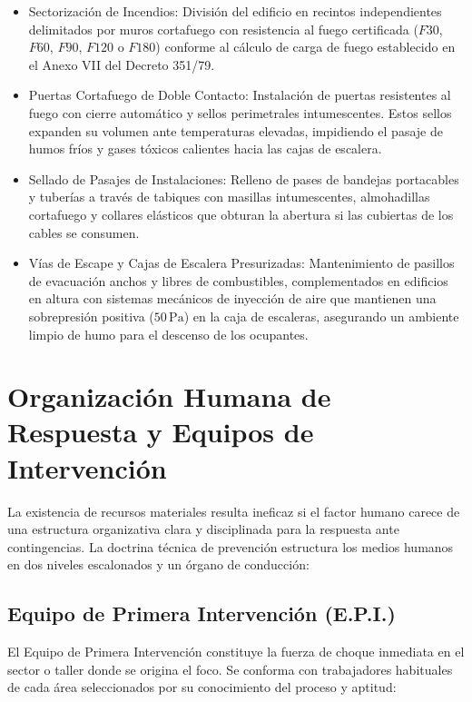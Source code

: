 \begin{itemize}
    \item Sectorización de Incendios: División del edificio en recintos independientes delimitados por muros cortafuego con
          resistencia al fuego certificada ($F30$, $F60$, $F90$, $F120$ o $F180$) conforme al cálculo de carga de fuego
          establecido en el Anexo VII del Decreto 351/79.
    \item Puertas Cortafuego de Doble Contacto: Instalación de puertas resistentes al fuego con cierre automático y sellos
          perimetrales intumescentes. Estos sellos expanden su volumen ante temperaturas elevadas, impidiendo el pasaje de
          humos fríos y gases tóxicos calientes hacia las cajas de escalera.
    \item Sellado de Pasajes de Instalaciones: Relleno de pases de bandejas portacables y tuberías a través de tabiques
          con masillas intumescentes, almohadillas cortafuego y collares elásticos que obturan la abertura si las cubiertas
          de los cables se consumen.
    \item Vías de Escape y Cajas de Escalera Presurizadas: Mantenimiento de pasillos de evacuación anchos y libres de
          combustibles, complementados en edificios en altura con sistemas mecánicos de inyección de aire que mantienen
          una sobrepresión positiva ($50\,\mathrm{Pa}$) en la caja de escaleras, asegurando un ambiente limpio de humo
          para el descenso de los ocupantes.
\end{itemize}

\section{Organización Humana de Respuesta y Equipos de Intervención}
\label{sec.cap7:organizacion_humana}

La existencia de recursos materiales resulta ineficaz si el factor humano carece de una estructura organizativa clara y
disciplinada para la respuesta ante contingencias. La doctrina técnica de prevención estructura los medios humanos en
dos niveles escalonados y un órgano de conducción:

\subsection{Equipo de Primera Intervención (E.P.I.)}

El Equipo de Primera Intervención constituye la fuerza de choque inmediata en el sector o taller donde se origina el
foco. Se conforma con trabajadores habituales de cada área seleccionados por su conocimiento del proceso y aptitud:

